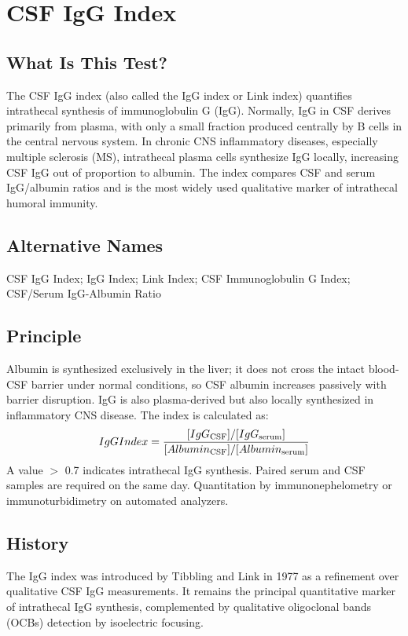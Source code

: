 \chapter{CSF IgG Index}

\section*{What Is This Test?}
The CSF IgG index (also called the IgG index or Link index) quantifies intrathecal synthesis of immunoglobulin G (IgG). Normally, IgG in CSF derives primarily from plasma, with only a small fraction produced centrally by B cells in the central nervous system. In chronic CNS inflammatory diseases, especially multiple sclerosis (MS), intrathecal plasma cells synthesize IgG locally, increasing CSF IgG out of proportion to albumin. The index compares CSF and serum IgG/albumin ratios and is the most widely used qualitative marker of intrathecal humoral immunity.

\section*{Alternative Names}
CSF IgG Index; IgG Index; Link Index; CSF Immunoglobulin G Index; CSF/Serum IgG-Albumin Ratio

\section*{Principle}
Albumin is synthesized exclusively in the liver; it does not cross the intact blood-CSF barrier under normal conditions, so CSF albumin increases passively with barrier disruption. IgG is also plasma-derived but also locally synthesized in inflammatory CNS disease. The index is calculated as:
\[
IgG Index = \frac{[IgG\textsubscript{\text{CSF}}]/[IgG\textsubscript{\text{serum}}]}{[Albumin\textsubscript{\text{CSF}}]/[Albumin\textsubscript{\text{serum}}]}
\]
A value $>$ 0.7 indicates intrathecal IgG synthesis. Paired serum and CSF samples are required on the same day. Quantitation by immunonephelometry or immunoturbidimetry on automated analyzers.

\section*{History}
The IgG index was introduced by Tibbling and Link in 1977 as a refinement over qualitative CSF IgG measurements. It remains the principal quantitative marker of intrathecal IgG synthesis, complemented by qualitative oligoclonal bands (OCBs) detection by isoelectric focusing.

